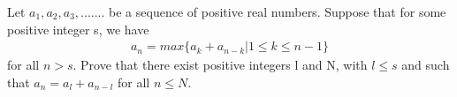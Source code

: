 
\item Let $a_1, a_2, a_3,.......$ be a sequence of positive real numbers. Suppose that for some positive integer s, we have 
\begin{align*}
a_n = max\{a_k + a_{n-k} | 1 \leq k \leq n - 1\}
\end{align*}
for all $n > s$. Prove that there exist positive integers l and N, with $l\leq s$ and such that  $a_n = a_l+a_{n - l}$ for all $n \leq N$.
